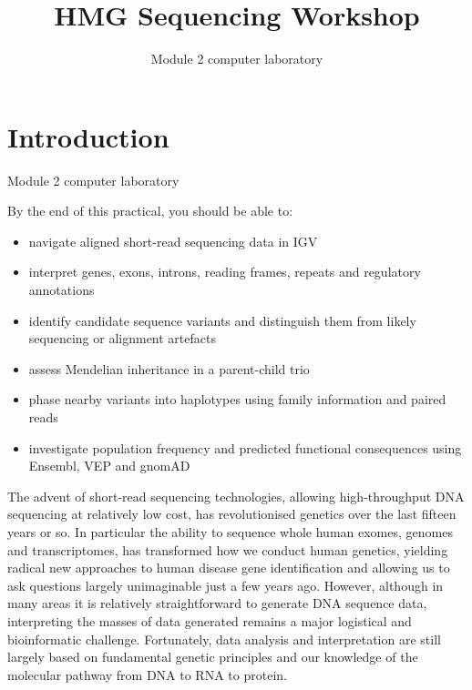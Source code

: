 \documentclass[
  letterpaper,
  DIV=11,
  numbers=noendperiod]{scrreprt}
\title{HMG Sequencing Workshop}
\subtitle{Module 2 computer laboratory}
\author{}
\date{}
\providecommand{\tightlist}{%
  \setlength{\itemsep}{0pt}\setlength{\parskip}{0pt}}
\renewcommand*\contentsname{Table of contents}
\newcommand\contentsname{Table of contents}
\begin{document}
\maketitle

\renewcommand*\contentsname{Table of contents}
{
\setcounter{tocdepth}{2}
\tableofcontents
}


\chapter{Introduction}\label{introduction}

Module 2 computer laboratory

\hfill\break

\begin{tcolorbox}[enhanced jigsaw, arc=.35mm, bottomrule=.15mm, bottomtitle=1mm, breakable, colback=white, colbacktitle=quarto-callout-note-color!10!white, colframe=quarto-callout-note-color-frame, coltitle=black, left=2mm, leftrule=.75mm, opacityback=0, opacitybacktitle=0.6, rightrule=.15mm, title=\textcolor{quarto-callout-note-color}{\faInfo}\hspace{0.5em}{\textbf{Intended Learning Outcomes}}, titlerule=0mm, toprule=.15mm, toptitle=1mm]

By the end of this practical, you should be able to:

\begin{itemize}
\tightlist
\item
  navigate aligned short-read sequencing data in IGV
\item
  interpret genes, exons, introns, reading frames, repeats and
  regulatory annotations
\item
  identify candidate sequence variants and distinguish them from likely
  sequencing or alignment artefacts
\item
  assess Mendelian inheritance in a parent-child trio
\item
  phase nearby variants into haplotypes using family information and
  paired reads
\item
  investigate population frequency and predicted functional consequences
  using Ensembl, VEP and gnomAD
\end{itemize}

\end{tcolorbox}

The advent of short-read sequencing technologies, allowing
high-throughput DNA sequencing at relatively low cost, has
revolutionised genetics over the last fifteen years or so. In particular
the ability to sequence whole human exomes, genomes and transcriptomes,
has transformed how we conduct human genetics, yielding radical new
approaches to human disease gene identification and allowing us to ask
questions largely unimaginable just a few years ago. However, although
in many areas it is relatively straightforward to generate DNA sequence
data, interpreting the masses of data generated remains a major
logistical and bioinformatic challenge. Fortunately, data analysis and
interpretation are still largely based on fundamental genetic principles
and our knowledge of the molecular pathway from DNA to RNA to protein.
\end{document}
